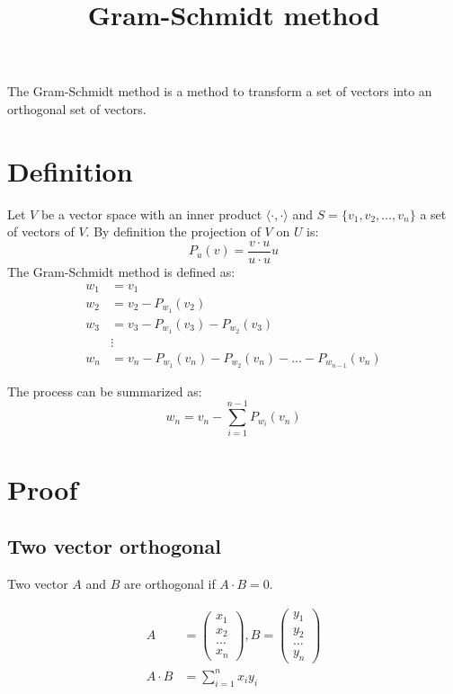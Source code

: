 \documentclass{article}
\begin{document}
\title{Gram-Schmidt method}
The Gram-Schmidt method is a method to transform a set of vectors into an orthogonal set of vectors.

\section{Definition}

Let $V$ be a vector space with an inner product $\langle\cdot,\cdot\rangle$ and $S = \{v_1, v_2, \dots, v_n\}$ a set of vectors of $V$.
By definition the projection of $V$ on $U$ is:
\begin{equation}
    P_u(v) = \frac{v \cdot u}{u \cdot u}u
\end{equation}
The Gram-Schmidt method is defined as:
\begin{equation}
    \begin{split}
        w_1 & = v_1 \\
        w_2 & = v_2 - P_{w_1}(v_2) \\
        w_3 & = v_3 - P_{w_1}(v_3) - P_{w_2}(v_3) \\
        & \vdots \\
        w_n & = v_n - P_{w_1}(v_n) - P_{w_2}(v_n) - \dots - P_{w_{n-1}}(v_n)
    \end{split}
\end{equation}

The process can be summarized as:
\begin{equation}
    w_n = v_n - \sum_{i=1}^{n-1} P_{w_i}(v_n)
\end{equation}

\section{Proof}

\subsection{Two vector orthogonal}

Two vector $A$ and $B$ are orthogonal if $A \cdot B = 0$.

\begin{equation}
    \begin{split}
        A & = \begin{pmatrix}x_1 \\ x_2 \\ \dots \\ x_n\end{pmatrix},
            B = \begin{pmatrix} y_1 \\ y_2 \\ \dots \\ y_n\end{pmatrix} \\
        A \cdot B & = \sum_{i=1}^n x_iy_i \\
    \end{split}
\end{equation}
\end{document}
